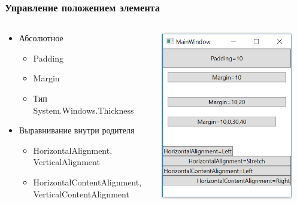 \documentclass[xetex,mathserif,serif]{beamer}
\begin{document}
	\begin{frame}
		\frametitle{Управление положением элемента}
		\begin{columns}
			\begin{column}{0.7\textwidth}
				\begin{itemize}
					\item Абсолютное
					\begin{itemize}
						\item Padding
						\item Margin
						\item Тип System.Windows.Thickness
					\end{itemize}
					\item Выравнивание внутри родителя
					\begin{itemize}
						\item HorizontalAlignment, VerticalAlignment
						\item HorizontalContentAlignment, VerticalContentAlignment
					\end{itemize}
				\end{itemize}
			\end{column}
			\begin{column}{0.3\textwidth}
				\begin{center}
					\includegraphics[width=0.9\textwidth]{geometryTest.png}
				\end{center}
			\end{column}
		\end{columns}
	\end{frame}
\end{document}
